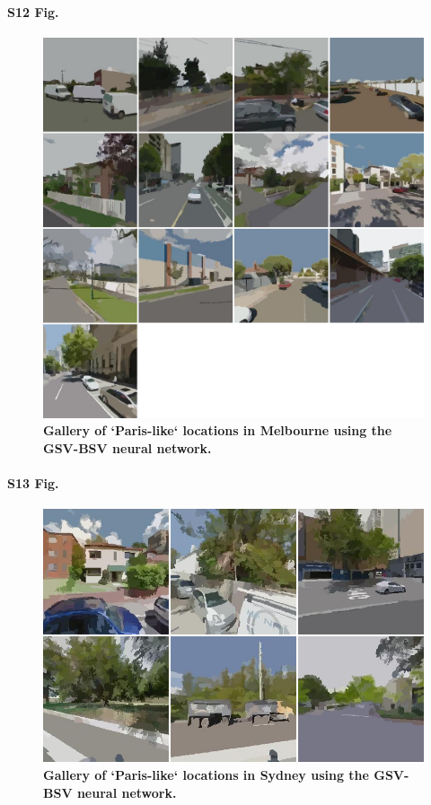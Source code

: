 \documentclass[10pt,letterpaper]{article}
\begin{document}
\paragraph*{S12 Fig.}
\begin{figure}[!htbp]
\centering    
\includegraphics[scale=0.35]{Images/PlosOne/Fig12.png}  
\caption{\bf Gallery of `Paris-like` locations in Melbourne using the GSV-BSV neural network.}    
 \label{fig:gsv_mel_gallery}  
\end{figure} 

\paragraph*{S13 Fig.}
\begin{figure}[!htbp]
\centering    
\includegraphics[scale=0.35]{Images/PlosOne/Fig13.png}  
\caption{\bf Gallery of `Paris-like` locations in Sydney using the GSV-BSV neural network.}    
 \label{fig:gsv_syd_gallery}  
\end{figure} 
\end{document}
